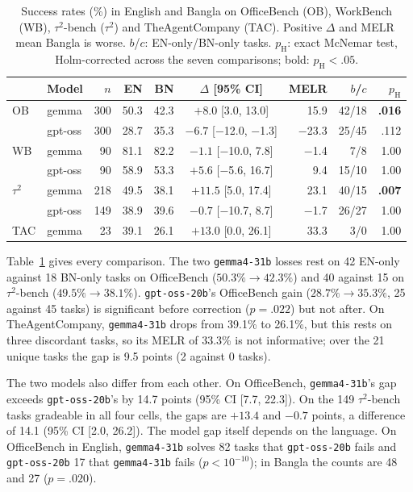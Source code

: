\documentclass[11pt]{article}
\newcommand{\gemma}{\texttt{gemma4-31b}}
\newcommand{\gptoss}{\texttt{gpt-oss-20b}}
\newcommand{\OB}{OfficeBench}
\newcommand{\WB}{WorkBench}
\newcommand{\TAU}{$\tau^2$-bench}
\newcommand{\TAC}{TheAgentCompany}
\begin{document}
\begin{table}[t]
\centering\small
\setlength{\tabcolsep}{6pt}
\begin{tabular}{llrrrcrrr}
\toprule
 & Model & $n$ & EN & BN & $\Delta$ [95\% CI] & MELR & $b$/$c$ & $p_{\mathrm{H}}$ \\
\midrule
OB  & gemma   & 300 & 50.3 & 42.3 & $+8.0$ [3.0, 13.0]        & 15.9   & 42/18 & \textbf{.016} \\
    & gpt-oss & 300 & 28.7 & 35.3 & $-6.7$ [$-$12.0, $-$1.3]  & $-$23.3 & 25/45 & .112 \\
WB  & gemma   & 90  & 81.1 & 82.2 & $-1.1$ [$-$10.0, 7.8]     & $-$1.4 & 7/8   & 1.00 \\
    & gpt-oss & 90  & 58.9 & 53.3 & $+5.6$ [$-$5.6, 16.7]     & 9.4    & 15/10 & 1.00 \\
$\tau^2$ & gemma & 218 & 49.5 & 38.1 & $+11.5$ [5.0, 17.4]   & 23.1   & 40/15 & \textbf{.007} \\
    & gpt-oss & 149 & 38.9 & 39.6 & $-0.7$ [$-$10.7, 8.7]     & $-$1.7 & 26/27 & 1.00 \\
TAC & gemma   & 23  & 39.1 & 26.1 & $+13.0$ [0.0, 26.1]       & 33.3   & 3/0   & 1.00 \\
\bottomrule
\end{tabular}
\caption{Success rates (\%) in English and Bangla on \OB{} (OB), \WB{} (WB), \TAU{} ($\tau^2$)
and \TAC{} (TAC). Positive $\Delta$ and MELR mean Bangla is worse. $b$/$c$: EN-only/BN-only tasks.
$p_{\mathrm{H}}$: exact McNemar test, Holm-corrected across the seven comparisons; bold:
$p_{\mathrm{H}}<.05$.}
\label{tab:rq1}
\end{table}

Table~\ref{tab:rq1} gives every comparison. The two \gemma{} losses rest on 42 EN-only against
18 BN-only tasks on \OB{} ($50.3\%\to42.3\%$) and 40 against 15 on \TAU{} ($49.5\%\to38.1\%$).
\gptoss{}'s \OB{} gain ($28.7\%\to35.3\%$, 25 against 45 tasks) is significant before correction
($p=.022$) but not after. On \TAC{}, \gemma{} drops from 39.1\% to 26.1\%,
but this rests on three discordant tasks, so its MELR of 33.3\% is not informative; over the 21
unique tasks the gap is 9.5 points (2 against 0 tasks).

The two models also differ from each other. On \OB{}, \gemma{}'s gap exceeds \gptoss{}'s by
14.7 points (95\% CI [7.7, 22.3]). On the 149 \TAU{} tasks gradeable in all four cells, the gaps
are $+13.4$ and $-0.7$ points, a difference of 14.1 (95\% CI [2.0, 26.2]). The model gap itself
depends on the language. On \OB{} in English, \gemma{} solves 82 tasks that \gptoss{} fails and
\gptoss{} 17 that \gemma{} fails ($p<10^{-10}$); in Bangla the counts are 48 and 27 ($p=.020$).
\end{document}
